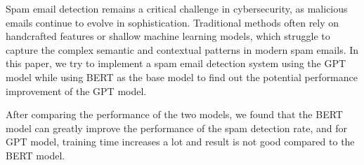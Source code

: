 Spam email detection remains a critical challenge in cybersecurity, as malicious emails continue to evolve in sophistication. Traditional
methods often rely on handcrafted features or shallow machine learning models, which struggle to capture the complex semantic and contextual 
patterns in modern spam emails. In this paper, we try to implement a spam email detection system using the GPT model while
using BERT as the base model to find out the potential performance improvement of the GPT model.

After comparing the performance of the two models, we found that the BERT model can greatly improve the performance of the spam 
detection rate, and for GPT model, training time increases a lot and result is not good compared to the BERT model.